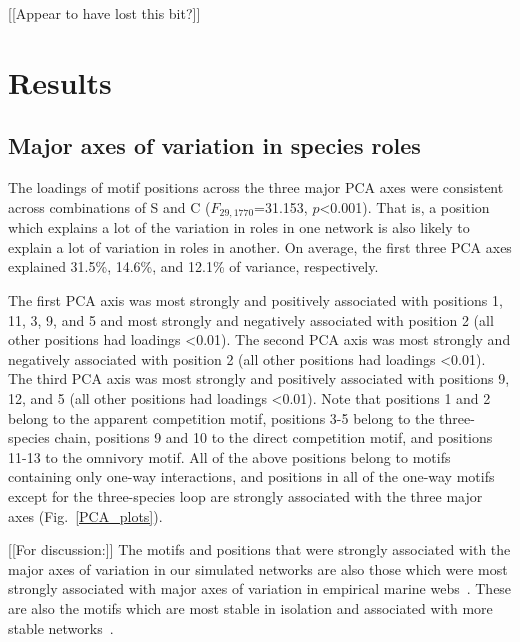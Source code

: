 \documentclass[12pt]{article}
\begin{document}
			[[Appear to have lost this bit?]]


\section*{Results}

	\subsection*{Major axes of variation in species roles}

		The loadings of motif positions across the three major PCA axes were consistent across combinations of S and C ($F_{29,1770}$=31.153, $p$\textless0.001). That is, a position which explains a lot of the variation in roles in one network is also likely to explain a lot of variation in roles in another. On average, the first three PCA axes explained 31.5\%, 14.6\%, and 12.1\% of variance, respectively.

		The first PCA axis was most strongly and positively associated with positions 1, 11, 3, 9, and 5 and most strongly and negatively associated with position 2 (all other positions had loadings \textless0.01). The second PCA axis was most strongly and negatively associated with position 2 (all other positions had loadings \textless0.01). The third PCA axis was most strongly and positively associated with positions 9, 12, and 5 (all other positions had loadings \textless0.01). Note that positions 1 and 2 belong to the apparent competition motif, positions 3-5 belong to the three-species chain, positions 9 and 10 to the direct competition motif, and positions 11-13 to the omnivory motif. All of the above positions belong to motifs containing only one-way interactions, and positions in all of the one-way motifs except for the three-species loop are strongly associated with the three major axes (Fig.~\ref{PCA_plots}). 


		[[For discussion:]]
		The motifs and positions that were strongly associated with the major axes of variation in our simulated networks are also those which were most strongly associated with major axes of variation in empirical marine webs~\citep{Cirtwill2018EcolLett}. These are also the motifs which are most stable in isolation and associated with more stable networks~\citep{Stouffer&Borrelli}. %


\end{document}
